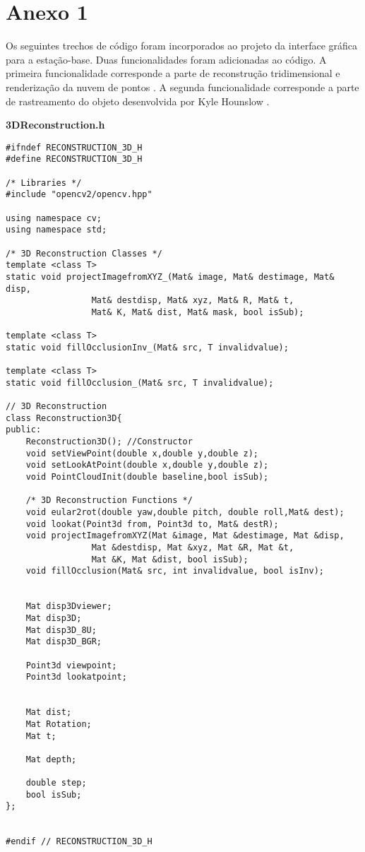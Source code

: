 \chapter{Anexo 1}
\label{Anexo1}

Os seguintes trechos de código foram incorporados ao projeto da interface gráfica para a estação-base. Duas funcionalidades foram adicionadas ao código. A primeira funcionalidade corresponde a parte de reconstrução tridimensional e renderização da nuvem de pontos \cite{UEDA2011}. A segunda funcionalidade corresponde a parte de rastreamento do objeto desenvolvida por Kyle Hounslow \cite{Hounslow2013}. 

\medskip
\lstset {language=C++}
\textbf{3DReconstruction.h}
\begin{lstlisting}[basicstyle=\tiny]
#ifndef RECONSTRUCTION_3D_H
#define RECONSTRUCTION_3D_H

/* Libraries */
#include "opencv2/opencv.hpp"

using namespace cv;
using namespace std;

/* 3D Reconstruction Classes */
template <class T>
static void projectImagefromXYZ_(Mat& image, Mat& destimage, Mat& disp, 
				 Mat& destdisp, Mat& xyz, Mat& R, Mat& t, 
				 Mat& K, Mat& dist, Mat& mask, bool isSub);

template <class T>
static void fillOcclusionInv_(Mat& src, T invalidvalue);

template <class T>
static void fillOcclusion_(Mat& src, T invalidvalue);

// 3D Reconstruction
class Reconstruction3D{
public:
    Reconstruction3D(); //Constructor
    void setViewPoint(double x,double y,double z);
    void setLookAtPoint(double x,double y,double z);
    void PointCloudInit(double baseline,bool isSub);

    /* 3D Reconstruction Functions */
    void eular2rot(double yaw,double pitch, double roll,Mat& dest);
    void lookat(Point3d from, Point3d to, Mat& destR);
    void projectImagefromXYZ(Mat &image, Mat &destimage, Mat &disp, 
			     Mat &destdisp, Mat &xyz, Mat &R, Mat &t,
			     Mat &K, Mat &dist, bool isSub);
    void fillOcclusion(Mat& src, int invalidvalue, bool isInv);


    Mat disp3Dviewer;
    Mat disp3D;
    Mat disp3D_8U;
    Mat disp3D_BGR;

    Point3d viewpoint;
    Point3d lookatpoint;


    Mat dist;
    Mat Rotation;
    Mat t;

    Mat depth;

    double step;
    bool isSub;
};


#endif // RECONSTRUCTION_3D_H
\end{lstlisting}

